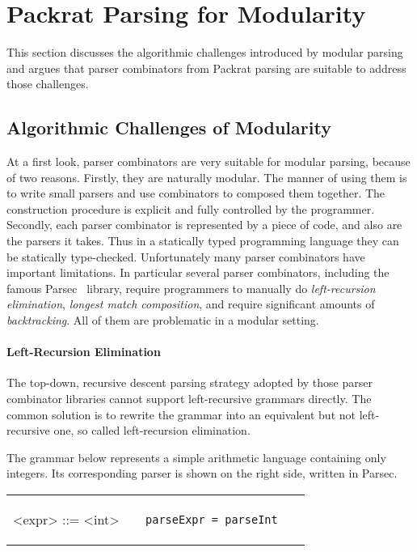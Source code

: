 \section{Packrat Parsing for Modularity}\label{sec:packrat}

This section discusses the algorithmic challenges introduced by modular parsing and argues that parser combinators from Packrat parsing
are suitable to address those challenges.

\subsection{Algorithmic Challenges of Modularity}\label{subsec:challenges}
At a first look, parser combinators are very suitable for modular parsing, because of two reasons. Firstly, they are naturally modular. The manner of using them is to write small parsers and use combinators to composed them together. The construction procedure is explicit and fully controlled by the programmer. Secondly, each parser combinator is represented by a piece of code, and also are the parsers it takes. Thus in a statically typed programming language they can be statically type-checked.
Unfortunately many parser combinators have important limitations.
In particular several parser combinators,
including the famous Parsec~\cite{Leijen2001} library, require
programmers to manually do \textit{left-recursion elimination}, \textit{longest match composition}, and
require significant amounts of \textit{backtracking}. All of them are
problematic in a modular setting.

\paragraph{Left-Recursion Elimination} The top-down, recursive descent parsing strategy adopted by those parser combinator libraries cannot support left-recursive grammars directly. The common solution is to rewrite the grammar into an equivalent but not left-recursive one, so called left-recursion elimination.

The grammar below represents a simple arithmetic language containing only integers. Its corresponding parser is shown on the right side, written in Parsec.

\begin{tabular}{m{0.4\linewidth}m{0.5\linewidth}}
\setlength{\grammarindent}{5em}
\begin{grammar}
<expr> ::= <int>
\end{grammar}
&
\begin{lstlisting}[language=PlainCode]
parseExpr = parseInt
\end{lstlisting}
\end{tabular}

